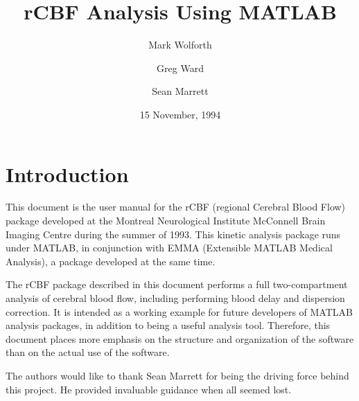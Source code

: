 
\title{rCBF Analysis Using MATLAB}
\author{Mark Wolforth \and Greg Ward \and Sean Marrett}
\date{15 November, 1994}
\def\code#1{{\tt #1}}


\def\ttlabel#1{{\tt #1: }}
\newenvironment{ttdescription}[1]
{\newbox\holder
 \setbox\holder=\hbox{\ttlabel#1}
 \dimen0=\wd\holder
 \begin{list}{}
 {\labelsep=-0.25in
  \rightmargin=0.25in
  \leftmargin=\dimen0
  \addtolength{\leftmargin}{0.25in}
  \labelwidth=\leftmargin
  \let\makelabel\ttlabel}}%
{\end{list}}



\maketitle

\tableofcontents

\newpage
\section{Introduction}

This document is the user manual for the rCBF (regional Cerebral
Blood Flow) package developed at the Montreal Neurological Institute
McConnell Brain Imaging Centre during the summer of 1993.  This
kinetic analysis package runs under MATLAB, in conjunction with EMMA
(Extensible MATLAB Medical Analysis), a package developed at the same
time.

The rCBF package described in this document performs a full
two-compartment analysis of cerebral blood flow, including performing
blood delay and dispersion correction.  It is intended as a working
example for future developers of MATLAB analysis packages, in
addition to being a useful analysis tool.  Therefore, this document
places more emphasis on the structure and organization of the
software than on the actual use of the software.

The authors would like to thank Sean Marrett for being the driving
force behind this project.  He provided invaluable guidance when all
seemed lost.

\newpage
